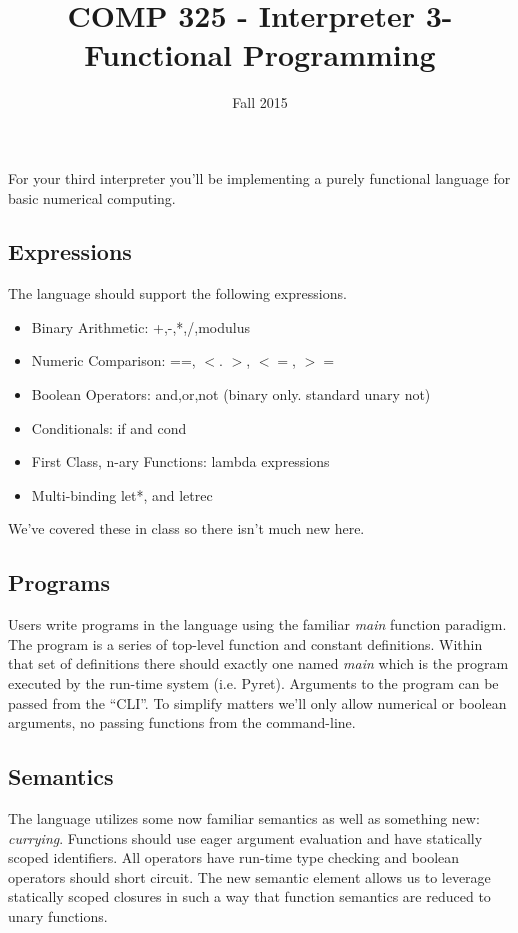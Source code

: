 \documentclass[10pt]{article}
\title{COMP 325 - Interpreter 3- Functional Programming}
\author{  }
\date{Fall 2015}
\begin{document}
\maketitle

For your third interpreter you'll be implementing a purely functional language for basic numerical computing. 

\subsection*{Expressions}

The language should support the following expressions. 
\begin{itemize}
\item Binary Arithmetic: +,-,*,/,modulus
\item Numeric Comparison: ==, $<$. $>$, $<=$, $>=$
\item Boolean Operators: and,or,not (binary only. standard unary not)
\item Conditionals: if and cond
\item First Class, n-ary Functions: lambda expressions
\item Multi-binding let*, and letrec
\end{itemize}
We've covered these in class so there isn't much new here. 

\subsection*{Programs}

Users write programs in the language using the familiar \textit{main} function paradigm. The program is a series of top-level function and constant definitions. Within that set of definitions there should exactly one named \textit{main} which is the program executed by the run-time system (i.e. Pyret). Arguments to the program can be passed from the ``CLI''. To simplify matters we'll only allow numerical or boolean arguments, no passing functions from the command-line. 

\subsection*{Semantics}

The language utilizes some now familiar semantics as well as something new: \textit{currying}. Functions should use eager argument evaluation and have statically scoped identifiers. All operators have run-time type checking and boolean operators should short circuit. The new semantic element allows us to leverage statically scoped closures in such a way that function semantics are reduced to unary functions. 
\end{document}
